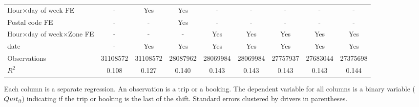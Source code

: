 \documentclass[reviewmode]{restud}
\begin{document}
\begin{landscape}
\begin{table}
{\begin{tabular}{l*{8}{S}}
            \addlinespace
            Hour\(\times\)day of week FE&         {-}         &       {Yes}         &       {Yes}         &         {-}         &         {-}         &         {-}         &         {-}         &         {-}         \\
            \addlinespace
            Postal code FE      &         {-}         &         {-}         &       {Yes}         &         {-}         &         {-}         &         {-}         &         {-}         &         {-}         \\
            \addlinespace
            Hour\(\times\)day of week\(\times\)Zone FE&         {-}         &         {-}         &         {-}         &       {Yes}         &       {Yes}         &       {Yes}         &       {Yes}         &       {Yes}         \\
            \addlinespace
            date                &         {-}         &       {Yes}         &       {Yes}         &       {Yes}         &       {Yes}         &       {Yes}         &       {Yes}         &       {Yes}         \\
            \midrule
            Observations        &\num{31108572}         &\num{31108572}         &\num{28087962}         &\num{28069984}         &\num{28069984}         &\num{27757937}         &\num{27683044}         &\num{27375698}         \\
            \(R^2\)             &     {0.108}         &     {0.127}         &     {0.140}         &     {0.143}         &     {0.143}         &     {0.143}         &     {0.143}         &     {0.144}         \\
            \bottomrule
            \end{tabular}
            }

			\begin{tablenotes}
            Each column is a separate regression. An observation is a trip or a booking. The dependent variable for all columns is a binary variable ($Quit_{it}$) indicating if the trip or booking is the last of the shift. Standard errors clustered by drivers in parentheses. 
			\end{tablenotes}
	\end{table}
\end{landscape}
\end{document}
